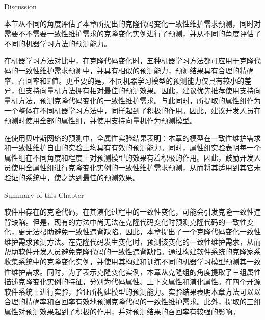 
{Discussion}

本节从不同的角度评估了本章所提出的克隆代码变化一致性维护需求预测，同时对需要不不需要一致性维护需求的克隆变化实例进行了预测，并从不同的角度评估了不同的机器学习方法的预测能力。

在机器学习方法对比中，在克隆代码变化时，五种机器学习方法都可应用于克隆代码的一致性维护需求预测中，并具有相似的预测能力，预测结果具有合理的精确率、召回率和F值。更重要的是，不同机器学习模型的预测能力仅具有较小的差异，但支持向量机方法拥有相对最佳的预测效果。因此，建议优先推荐使用支持向量机方法，预测克隆代码变化的一致性维护需求。与此同时，所提取的属性组作为一个整体在不同机器学习方法中，同样起到了积极的作用。因此，建议开发人员在预测时使用全部的属性组，并使用支持向量机作为预测模型。

在使用贝叶斯网络的预测中，全属性实验结果表明：本章的模型在一致性维护需求和一致性维护自由的实验上均具有有效的预测能力。同时，属性组实验表明每一个属性组在不同角度和程度上对预测模型的效果有着积极的作用。因此，鼓励开发人员使用全属性组进行克隆变化实例的一致性维护需求预测，从而将其适用到其它未验证的系统中，使之达到最佳的预测效果。

{Summary of this Chapter}

软件中存在的克隆代码，在其演化过程中的一致性变化，可能会引发克隆一致性违背缺陷。但是，现有的方法中尚无法在克隆代码变化时预测克隆代码的一致性变化，更无法帮助避免一致性违背缺陷。因此，本章提出了一个克隆代码变化一致性维护需求预测方法。在克隆代码发生变化时，预测该变化的一致性维护需求，从而帮助软件开发人员避免克隆代码的一致性违背缺陷。通过构建软件系统的克隆家系收集系统中的克隆变化实例，并使用其构建和训练不同的机器学习模型预测其一致性维护需求。同时，为了表示克隆变化实例，本章从克隆组的角度提取了三组属性描述克隆变化实例的特征，分别为代码属性、上下文属性和演化属性。在四个开源软件系统上进行实验，验证所构建模型的预测能力。实验结果表明本章方法可以以合理的精确率和召回率有效地预测克隆代码的一致性维护需求。此外，提取的三组属性对预测效果起到了积极的作用，并对预测结果的召回率有较强的影响。

